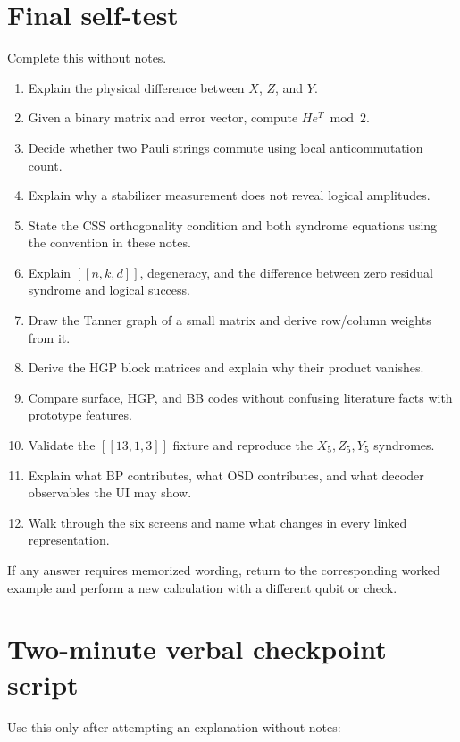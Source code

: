 \documentclass[11pt]{article}
\begin{document}
\section{Final self-test}

Complete this without notes.

\begin{enumerate}
  \item Explain the physical difference between \(X\), \(Z\), and \(Y\).
  \item Given a binary matrix and error vector, compute \(He^T\bmod2\).
  \item Decide whether two Pauli strings commute using local anticommutation count.
  \item Explain why a stabilizer measurement does not reveal logical amplitudes.
  \item State the CSS orthogonality condition and both syndrome equations using the convention in
  these notes.
  \item Explain \([[n,k,d]]\), degeneracy, and the difference between zero residual syndrome and
  logical success.
  \item Draw the Tanner graph of a small matrix and derive row/column weights from it.
  \item Derive the HGP block matrices and explain why their product vanishes.
  \item Compare surface, HGP, and BB codes without confusing literature facts with prototype features.
  \item Validate the \([[13,1,3]]\) fixture and reproduce the \(X_5,Z_5,Y_5\) syndromes.
  \item Explain what BP contributes, what OSD contributes, and what decoder observables the UI may show.
  \item Walk through the six screens and name what changes in every linked representation.
\end{enumerate}

If any answer requires memorized wording, return to the corresponding worked example and perform a
new calculation with a different qubit or check.

\section{Two-minute verbal checkpoint script}

Use this only after attempting an explanation without notes:
\end{document}
